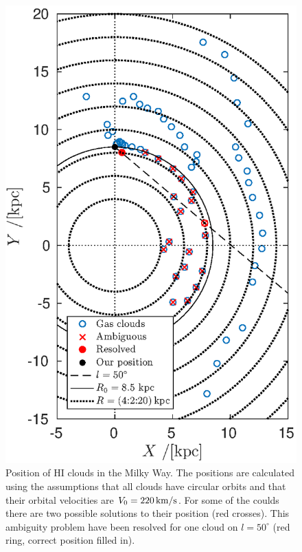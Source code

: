 \documentclass[11pt,a4paper, twocolumn,
swedish, english %
]{article}
\begin{document}
\begin{figure}\centering
\includegraphics[width=1\linewidth]{gas_clouds.eps}
\caption{Position of HI clouds in the Milky Way. The positions are
  calculated using the assumptions that all clouds have circular
  orbits and that their orbital velocities are
  $V_0=\unit[220]{km/s}$. For some of the coulds there are two
  possible solutions to their position (red crosses). This ambiguity
  problem have been resolved for one cloud on $l=50^\circ$ (red ring,
  correct position filled in). }
\label{fig:clouds}
\end{figure}
\end{document}

